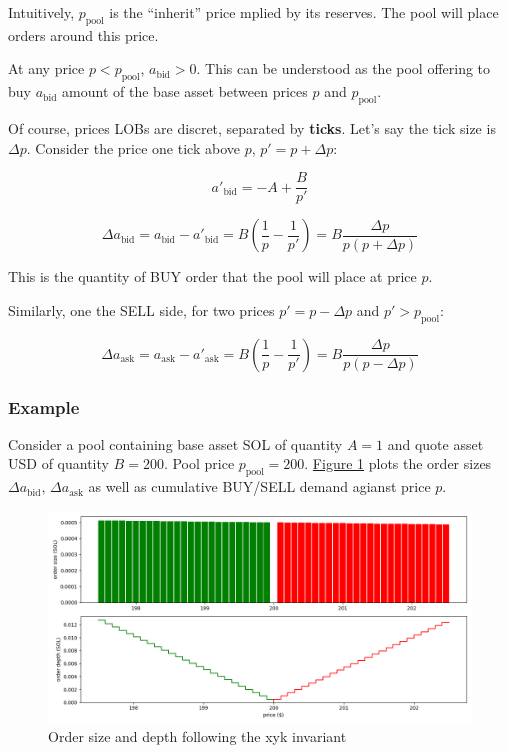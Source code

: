 \documentclass{article}
\begin{document}
Intuitively, $p_{\mathrm{pool}}$ is the ``inherit'' price mplied by its reserves. The pool will place orders around this price.

At any price $p < p_{\mathrm{pool}}$, $a_{\mathrm{bid}} > 0$. This can be understood as the pool offering to buy $a_{\mathrm{bid}}$ amount of the base asset between prices $p$ and $p_{\mathrm{pool}}$.

Of course, prices LOBs are discret, separated by \textbf{ticks}. Let's say the tick size is $\Delta p$. Consider the price one tick above $p$, $p' = p + \Delta p$:

\begin{equation}
  a'_{\mathrm{bid}} = -A + \frac{B}{p'}
\end{equation}

\begin{equation}
  \Delta a_{\mathrm{bid}} = a_{\mathrm{bid}} - a'_{\mathrm{bid}} = B \left(\frac{1}{p} - \frac{1}{p'} \right) = B \frac{\Delta p}{p (p + \Delta p)}
\end{equation}

This is the quantity of BUY order that the pool will place at price $p$.

Similarly, one the SELL side, for two prices $p' = p - \Delta p$ and $p' > p_{\mathrm{pool}}$:

\begin{equation}
  \Delta a_{\mathrm{ask}} = a_{\mathrm{ask}} - a'_{\mathrm{ask}} = B \left(\frac{1}{p} - \frac{1}{p'} \right) = B \frac{\Delta p}{p (p - \Delta p)}
\end{equation}

\subsubsection{Example}

Consider a pool containing base asset SOL of quantity $A = 1$ and quote asset USD of quantity $B = 200$. Pool price $p_{\mathrm{pool}} = 200$. \hyperref[fig:1]{Figure 1} plots the order sizes $\Delta a_{\mathrm{bid}}$, $\Delta a_{\mathrm{ask}}$ as well as cumulative BUY/SELL demand agianst price $p$.

\begin{figure}
  \includegraphics[width=\textwidth]{1-xyk.png}
  \caption{Order size and depth following the xyk invariant}
  \label{fig:1}
\end{figure}
\end{document}
